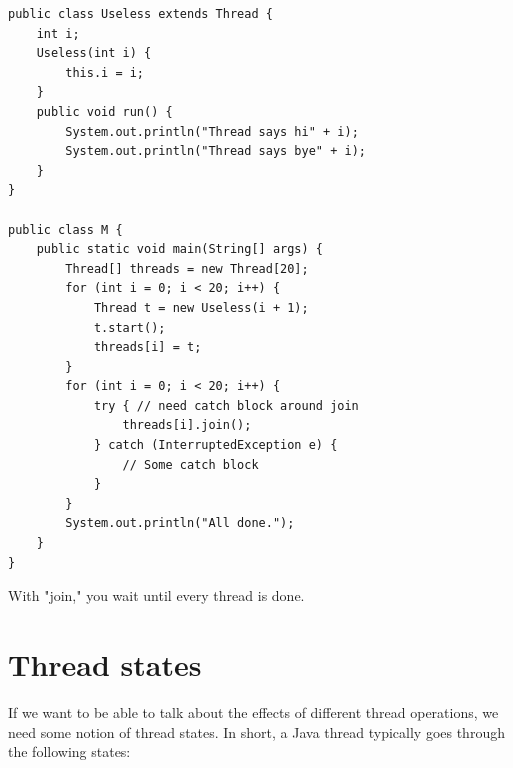 \documentclass{article}
\begin{document}
\begin{lstlisting}
public class Useless extends Thread {
    int i;
    Useless(int i) {
        this.i = i;
    }
    public void run() {
        System.out.println("Thread says hi" + i);
        System.out.println("Thread says bye" + i);
    }
}

public class M {
    public static void main(String[] args) {
        Thread[] threads = new Thread[20];
        for (int i = 0; i < 20; i++) {
            Thread t = new Useless(i + 1);
            t.start();
            threads[i] = t;
        }
        for (int i = 0; i < 20; i++) {
            try { // need catch block around join
                threads[i].join();
            } catch (InterruptedException e) {
                // Some catch block
            }
        }
        System.out.println("All done.");
    }
}
\end{lstlisting}

With "join," you wait until every thread is done.

\section{Thread states}

If we want to be able to talk about the effects of different thread operations, we need some notion of thread states. In short, a Java thread typically goes through the following states:
\end{document}
